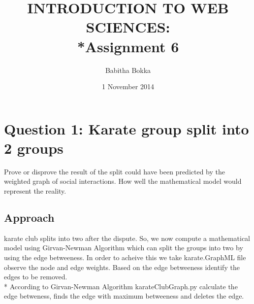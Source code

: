 \documentclass[12pt]{article}
\begin{document}
\begin{titlepage}
\title{INTRODUCTION TO WEB SCIENCES:\\*Assignment 6}
\author{Babitha Bokka}
\date{1 November 2014}
\maketitle
\end{titlepage}

\tableofcontents
\newpage
\section{Question 1: Karate group split into 2 groups}
Prove or disprove the result of the split could have been predicted by the weighted graph of social interactions. How well the mathematical model would represent the reality.
\subsection{Approach}
karate club splits into two after the dispute. So, we now compute  a mathematical model using Girvan-Newman Algorithm which can split the groups into two by using the edge betweeness. In order to acheive this we take karate.GraphML file observe the node and edge weights. Based on the edge betweeness identify the edges to be removed. \\*
According to Girvan-Newman Algorithm karateClubGraph.py calculate the edge betweness, finds the edge with maximum betweeness and deletes the edge.
\end{document}

